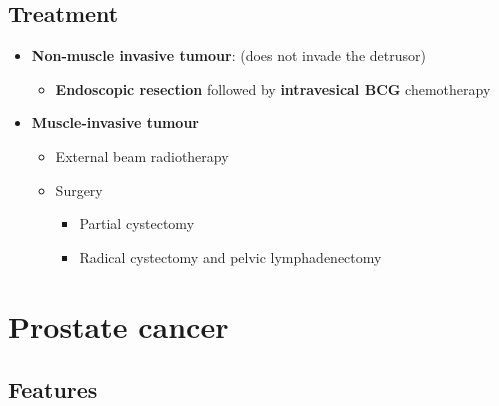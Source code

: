 \documentclass[
  12pt,
]{memoir}
\providecommand{\tightlist}{%
  \setlength{\itemsep}{0pt}\setlength{\parskip}{0pt}}
\begin{document}
\hypertarget{treatment-6}{%
\subsection{Treatment}\label{treatment-6}}

\begin{itemize}
\tightlist
\item
  \textbf{Non-muscle invasive tumour}: (does not invade the detrusor)

  \begin{itemize}
  \tightlist
  \item
    \textbf{Endoscopic resection} followed by \textbf{intravesical BCG}
    chemotherapy
  \end{itemize}
\item
  \textbf{Muscle-invasive tumour}

  \begin{itemize}
  \tightlist
  \item
    External beam radiotherapy
  \item
    Surgery

    \begin{itemize}
    \tightlist
    \item
      Partial cystectomy
    \item
      Radical cystectomy and pelvic lymphadenectomy
    \end{itemize}
  \end{itemize}
\end{itemize}

\pagebreak

\hypertarget{prostate-cancer}{%
\section{Prostate cancer}\label{prostate-cancer}}

\hypertarget{features-8}{%
\subsection{Features}\label{features-8}}
\end{document}
